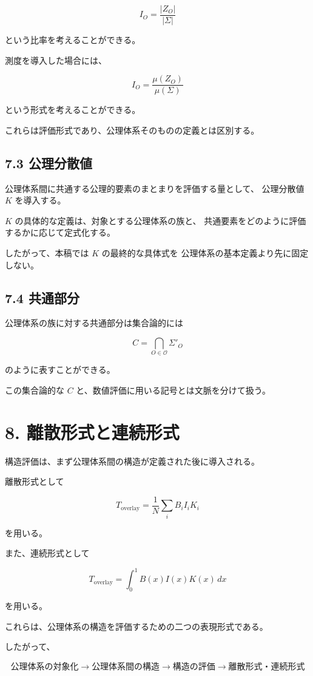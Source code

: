 \documentclass[11pt]{article}
\begin{document}
\[
I_O=
\frac{|Z_O|}{|\Sigma|}
\]

という比率を考えることができる。

測度を導入した場合には、

\[
I_O=
\frac{\mu(Z_O)}{\mu(\Sigma)}
\]

という形式を考えることができる。

これらは評価形式であり、公理体系そのものの定義とは区別する。

\subsection{7.3 公理分散値}

公理体系間に共通する公理的要素のまとまりを評価する量として、
公理分散値 $K$ を導入する。

$K$ の具体的な定義は、対象とする公理体系の族と、
共通要素をどのように評価するかに応じて定式化する。

したがって、本稿では $K$ の最終的な具体式を
公理体系の基本定義より先に固定しない。

\subsection{7.4 共通部分}

公理体系の族に対する共通部分は集合論的には

\[
C=\bigcap_{O\in\mathcal{O}}\Sigma'_O
\]

のように表すことができる。

この集合論的な $C$ と、数値評価に用いる記号とは文脈を分けて扱う。

\section{8. 離散形式と連続形式}

構造評価は、まず公理体系間の構造が定義された後に導入される。

離散形式として

\[
T_{\mathrm{overlay}}
=
\frac{1}{N}
\sum_i B_iI_iK_i
\]

を用いる。

また、連続形式として

\[
T_{\mathrm{overlay}}
=
\int_0^1 B(x)I(x)K(x)\,dx
\]

を用いる。

これらは、公理体系の構造を評価するための二つの表現形式である。

したがって、

\[
\text{公理体系の対象化}
\rightarrow
\text{公理体系間の構造}
\rightarrow
\text{構造の評価}
\rightarrow
\text{離散形式・連続形式}
\]
\end{document}
